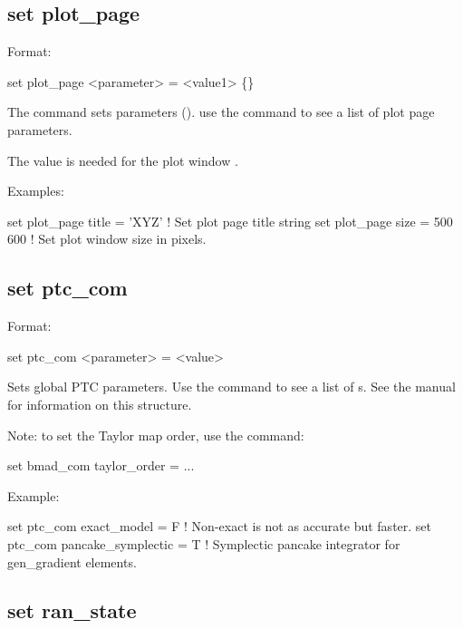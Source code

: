 {{{{{{\subsection{set plot\_page}
\label{s:set.plot.page}

Format:
\begin{example}
  set plot_page <parameter> = <value1> \{<value2>\}
\end{example}

The  command sets  parameters ().
use the  command to see a list of plot page parameters.

The  value is needed for the plot window .

Examples:
\begin{example}
  set plot_page title = 'XYZ'  ! Set plot page title string
  set plot_page size = 500 600 ! Set plot window size in pixels.
\end{example}


\subsection{set ptc_com}
\label{s:set.ptc.com}

Format:
\begin{example}
  set ptc_com <parameter> = <value>
\end{example}

Sets global PTC parameters. Use the  command to see a list of
s. See the \bmad manual for information on this structure.

Note: to set the Taylor map order, use the command:
\begin{example}
  set bmad_com taylor_order = ...
\end{example}

Example:
\begin{example}
  set ptc_com exact_model = F ! Non-exact is not as accurate but faster.
  set ptc_com pancake_symplectic = T ! Symplectic pancake integrator for gen_gradient elements.
\end{example}


\subsection{set ran\_state}
\label{s:set.ran.state}

}}}}}}
